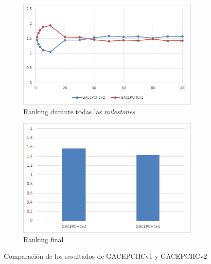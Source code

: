 \begin{figure}[h]
     \centering
     \begin{subfigure}[b]{0.45\textwidth}
         \centering
         \includegraphics[width=\textwidth]{imagenes/Experimental/GACEPCHCv1vsGACEPCHCv2.png}
         \caption{Ranking durante todas las \textit{milestones}}
         \label{fig:GACEPCHCv1vsGACEPCHCv2_lineas}
     \end{subfigure}
     \hfill
     \begin{subfigure}[b]{0.45\textwidth}
         \centering
         \includegraphics[width=\textwidth]{imagenes/Experimental/barras/GACEPCHCv1vsGACEPCHCv2.png}
         \caption{Ranking final}
         \label{fig:GACEPCHCv1vsGACEPCHCv2_barras}
     \end{subfigure}
        \caption{Comparación de los resultados de GACEPCHCv1 y GACEPCHCv2}
        \label{fig:GACEPCHCv1vsGACEPCHCv2}
\end{figure}

